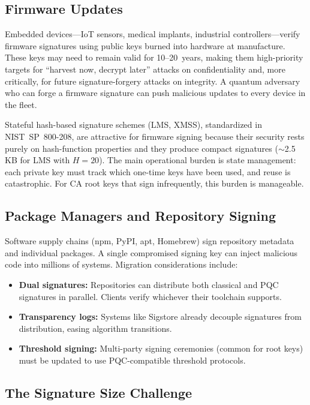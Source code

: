 \subsection{Firmware Updates}
\label{subsec:firmware}

Embedded devices---IoT sensors, medical implants, industrial controllers---verify firmware signatures using public keys burned into hardware at manufacture.  These keys may need to remain valid for 10--20~years, making them high-priority targets for ``harvest now, decrypt later'' attacks on confidentiality and, more critically, for future signature-forgery attacks on integrity.  A quantum adversary who can forge a firmware signature can push malicious updates to every device in the fleet.

Stateful hash-based signature schemes (LMS, XMSS), standardized in NIST~SP~800-208, are attractive for firmware signing because their security rests purely on hash-function properties and they produce compact signatures ($\sim$2.5\,KB for LMS with $H=20$).  The main operational burden is state management: each private key must track which one-time keys have been used, and reuse is catastrophic.  For CA root keys that sign infrequently, this burden is manageable.

\subsection{Package Managers and Repository Signing}
\label{subsec:package-managers}

Software supply chains (npm, PyPI, apt, Homebrew) sign repository metadata and individual packages.  A single compromised signing key can inject malicious code into millions of systems.  Migration considerations include:
\begin{itemize}
\item \textbf{Dual signatures:} Repositories can distribute both classical and PQC signatures in parallel.  Clients verify whichever their toolchain supports.
\item \textbf{Transparency logs:} Systems like Sigstore already decouple signatures from distribution, easing algorithm transitions.
\item \textbf{Threshold signing:} Multi-party signing ceremonies (common for root keys) must be updated to use PQC-compatible threshold protocols.
\end{itemize}

\subsection{The Signature Size Challenge}
\label{subsec:sig-size-challenge}

